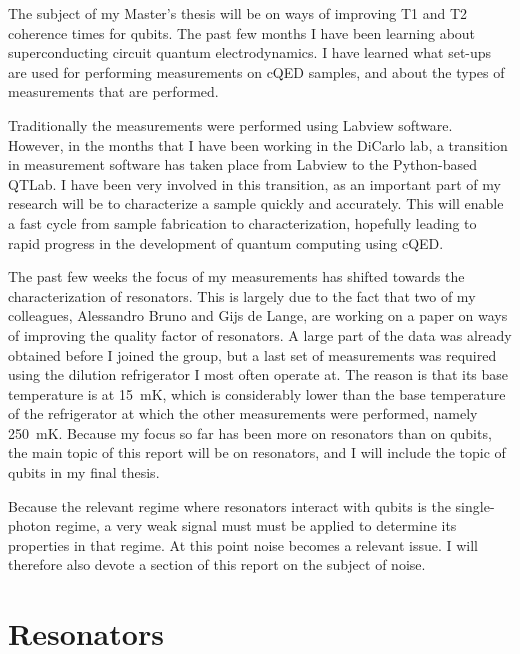 \documentclass[12pt]{report}
\begin{document}
The subject of my Master's thesis will be on ways of improving T1 and T2 coherence times for qubits. The past few months I have been learning about superconducting circuit quantum electrodynamics. I have learned what set-ups are used for performing measurements on cQED samples, and about the types of measurements that are performed.

Traditionally the measurements were performed using Labview software. However, in the months that I have been working in the DiCarlo lab, a transition in measurement software has taken place from Labview to the Python-based QTLab. I have been very involved in this transition, as an important part of my research will be to characterize a sample quickly and accurately. This will enable a fast cycle from sample fabrication to characterization, hopefully leading to rapid progress in the development of quantum computing using cQED.

The past few weeks the focus of my measurements has shifted towards the characterization of resonators. This is largely due to the fact that two of my colleagues, Alessandro Bruno and Gijs de Lange, are working on a paper on ways of improving the quality factor of resonators. A large part of the data was already obtained before I joined the group, but a last set of measurements was required using the dilution refrigerator I most often operate at. The reason is that its base temperature is at \SI{15}{\milli \kelvin}, which is considerably lower than the base temperature of the refrigerator at which the other measurements were performed, namely \SI{250}{\milli \kelvin}. Because my focus so far has been more on resonators than on qubits, the main topic of this report will be on resonators, and I will include the topic of qubits in my final thesis.

Because the relevant regime where resonators interact with qubits is the single-photon regime, a very weak signal must must be applied to determine its properties in that regime. At this point noise becomes a relevant issue. I will therefore also devote a section of this report on the subject of noise.

\newpage










\chapter{Resonators}
\label{chapter:Resonators}
\end{document}
